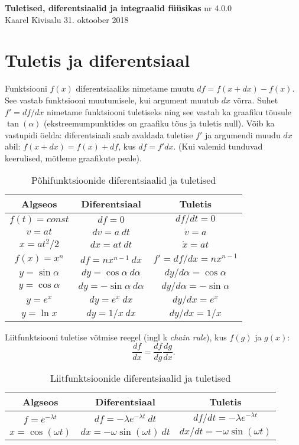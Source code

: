 \documentclass[a4paper,11pt,twocolumn]{article}
\begin{document}
{\huge \textbf{Tuletised, diferentsiaalid ja integraalid füüsikas} \hfill \normalsize {nr 4.0.0}} \\
{Kaarel Kivisalu \hfill 31. oktoober 2018}

\section{Tuletis ja diferentsiaal}
Funktsiooni \( f(x) \) diferentsiaaliks nimetame muutu \( df = f(x + dx) − f(x) \). See vastab funktsiooni muutumisele, kui argument muutub \( dx \) võrra. Suhet \( f' = df /dx \) nimetame funktsiooni tuletiseks ning see vastab ka graafiku tõusule \( \tan(\alpha) \) (ekstreemumpunktides on graafiku tõus ja tuletis null). Võib ka vastupidi öelda: diferentsiaali saab avaldada tuletise \( f' \) ja argumendi muudu \( dx \) abil: \( f(x + dx) = f(x) + df \), kus \( df = f'dx \). (Kui valemid tunduvad keerulised, mõtleme graafikute peale).

\begin{table}[h]
	\centering
	\caption{Põhifunktsioonide diferentsiaalid ja tuletised}
	\begin{tabular}{ c | c | c }
		\hline \hline
		Algseos & Diferentsiaal & Tuletis \\ 
		\hline
		\( f(t)=const \) & \( df=0 \) & \( df/dt=0 \) \\  
		\( v=at \) & \( dv=a\ dt \) & \( \dot{v}=a \) \\
		\( x=at^2/2 \) & \( dx=at\ dt \) & \( \dot{x}=at \) \\
		\( f(x)=x^n \) & \( df=nx^{n-1}\ dx \) & \( f'=df/dx=nx^{n-1} \) \\
		\( y=\sin \alpha \) & \( dy=\cos \alpha\ d\alpha \) & \( dy/d\alpha=\cos \alpha \) \\  
		\( y=\cos \alpha \) & \( dy=-\sin \alpha\ d\alpha \) & \( dy/d\alpha=-\sin \alpha  \) \\
		\( y=e^x \) & \( dy=e^x\ dx \) & \( dy/dx=e^x \) \\ 
		\( y=\ln x \) & \( dy=1/x\ dx \) & \( dy/dx=1/x \) \\ 
	\end{tabular}
\end{table}

Liitfunktsiooni tuletise võtmise reegel (ingl k \textit{chain rule}), kus \( f(g) \) ja \( g(x) \):
\[ \frac{df}{dx}=\frac{df}{dg}\frac{dg}{dx} \textrm{.}\]

\begin{table}[h!]
	\centering
	\caption{Liitfunktsioonide diferentsiaalid ja tuletised}
	\begin{tabular}{ c | c | c }
		\hline \hline
		Algseos & Diferentsiaal & Tuletis \\ 
		\hline
		\( f=e^{-\lambda t} \) & \( df=-\lambda e^{-\lambda t}\ dt \) & \( df/dt=-\lambda e^{-\lambda t} \) \\  
		\( x=\cos (\omega t) \) & \( dx=-\omega\sin (\omega t)\ dt\) & \( dx/dt=-\omega\sin (\omega t) \) \\
	\end{tabular}
\end{table}
\end{document}
